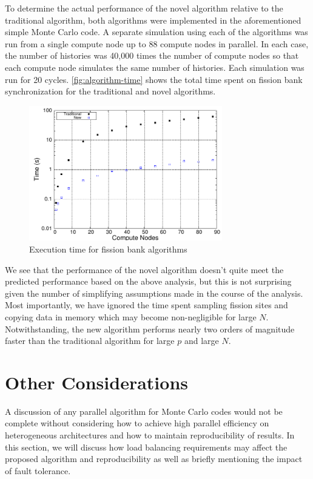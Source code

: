 To determine the actual performance of the novel algorithm relative to the
traditional algorithm, both algorithms were implemented in the aforementioned
simple Monte Carlo code. A separate simulation using each of the algorithms was
run from a single compute node up to 88 compute nodes in parallel. In each case,
the number of histories was 40,000 times the number of compute nodes so that
each compute node simulates the same number of histories. Each simulation was
run for 20 cycles. \autoref{fig:algorithm-time} shows the total time spent on
fission bank synchronization for the traditional and novel algorithms.
\begin{figure}[ht!]
  \centering
  \includegraphics[width=0.75\textwidth]{figures/ch3/algorithm_results/time.pdf}
  \caption{Execution time for fission bank algorithms}
  \label{fig:algorithm-time}
\end{figure}
We see that the performance of the novel algorithm doesn't quite meet the
predicted performance based on the above analysis, but this is not surprising
given the number of simplifying assumptions made in the course of the
analysis. Most importantly, we have ignored the time spent sampling fission
sites and copying data in memory which may become non-negligible for large
$N$. Notwithstanding, the new algorithm performs nearly two orders of magnitude
faster than the traditional algorithm for large $p$ and large $N$.

\section{Other Considerations}
\label{sec:other}

A discussion of any parallel algorithm for Monte Carlo codes would not be
complete without considering how to achieve high parallel efficiency on
heterogeneous architectures and how to maintain reproducibility of results. In
this section, we will discuss how load balancing requirements may affect the
proposed algorithm and reproducibility as well as briefly mentioning the impact
of fault tolerance.

